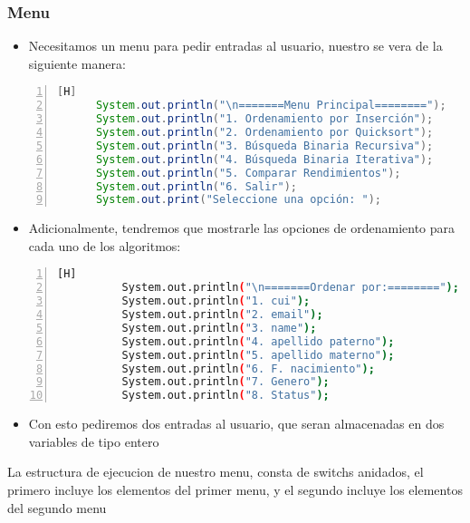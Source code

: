 \subsubsection{Menu}
\begin{itemize}
  \item Necesitamos un menu para pedir entradas al usuario, nuestro se vera de la siguiente manera:
\end{itemize}

\begin{lstlisting}[language=java, caption={Menu}, numbers=left, firstnumber=1][H]
      System.out.println("\n=======Menu Principal========");
      System.out.println("1. Ordenamiento por Inserción");
      System.out.println("2. Ordenamiento por Quicksort");
      System.out.println("3. Búsqueda Binaria Recursiva");
      System.out.println("4. Búsqueda Binaria Iterativa");
      System.out.println("5. Comparar Rendimientos");
      System.out.println("6. Salir");
      System.out.print("Seleccione una opción: ");

\end{lstlisting}
\begin{itemize}
  \item Adicionalmente, tendremos que mostrarle las opciones de ordenamiento para cada uno de los algoritmos:
\end{itemize} 
\begin{lstlisting}[language=bash, caption={Menu}, numbers=left, firstnumber=1][H]
          System.out.println("\n=======Ordenar por:========");
          System.out.println("1. cui");
          System.out.println("2. email");
          System.out.println("3. name");
          System.out.println("4. apellido paterno");
          System.out.println("5. apellido materno");
          System.out.println("6. F. nacimiento");
          System.out.println("7. Genero");
          System.out.println("8. Status");
\end{lstlisting}
\begin{itemize}
  \item Con esto pediremos dos entradas al usuario, que seran almacenadas en dos variables de tipo entero 

\end{itemize}

La estructura de ejecucion de nuestro menu, consta de switchs anidados, el primero incluye los elementos del primer menu, y el segundo incluye los elementos del segundo menu



